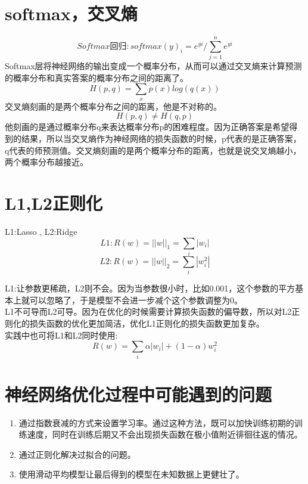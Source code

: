 \documentclass[16pt,UTF8]{ctexart}
\begin{document}
\LARGE

\section{softmax，交叉熵}
	\begin{displaymath}
	Softmax\textrm{回归}:softmax(y)_{i} = e^{yi}/\sum_{j=1}^n e^{yi}	
	\end{displaymath}
	Softmax层将神经网络的输出变成一个概率分布，从而可以通过交叉熵来计算预测的概率分布和真实答案的概率分布之间的距离了。\\
	\begin{displaymath}
	H(p,q) = \sum_{x} p(x)log(q(x)) 
	\end{displaymath}
	交叉熵刻画的是两个概率分布之间的距离，他是不对称的。
	\begin{displaymath}
  	H(p,q) \neq H(q,p)
	\end{displaymath}
	他刻画的是通过概率分布q来表达概率分布p的困难程度。因为正确答案是希望得到的结果，所以当交叉熵作为神经网络的损失函数的时候，p代表的是正确答案，q代表的师预测值。交叉熵刻画的是两个概率分布的距离，也就是说交叉熵越小，两个概率分布越接近。
	
\section{L1,L2正则化}
	\indent L1:Lasso , L2:Ridge \\		

	\begin{displaymath}
	L1:R(w) = ||w||_{1} = \sum_{i}|w_{i}|
	\end{displaymath}
	\begin{displaymath}
	L2:R(w) = ||w||_{2} = \sum_{i}|w_{i}^{2}|
	\end{displaymath}
	
	\indent L1:让参数更稀疏，L2则不会。因为当参数很小时，比如0.001，这个参数的平方基本上就可以忽略了，于是模型不会进一步减个这个参数调整为0。\\
	\indent L1不可导而L2可导。因为在优化的时候需要计算损失函数的偏导数，所以对L2正则化的损失函数的优化更加简洁，优化L1正则化的损失函数更加复杂。\\
	\indent 实践中也可将L1和L2同时使用:
	\begin{displaymath}
		R(w) = \sum_{i}\alpha|w_{i}| + (1 - \alpha)w_{i}^{2}
	\end{displaymath}
	
\section{神经网络优化过程中可能遇到的问题}
	\begin{enumerate}
	\item 通过指数衰减的方式来设置学习率。通过这种方法，既可以加快训练初期的训练速度，同时在训练后期又不会出现损失函数在极小值附近徘徊往返的情况。
	\item 通过正则化解决过拟合的问题。
	\item 使用滑动平均模型让最后得到的模型在未知数据上更健壮了。
	\end{enumerate}
\end{document}
